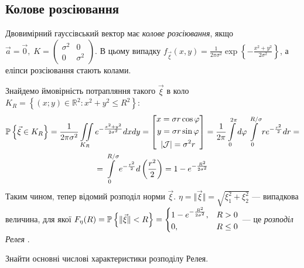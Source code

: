 \subsection{Колове розсіювання}
\begin{definition}
    Двовимірний гауссівський вектор має \emph{колове розсіювання}, якщо
    $\vec{a} = \vec{0}, \; K = \begin{pmatrix}
        \sigma^2 & 0 \\
        0 & \sigma^2
    \end{pmatrix}$. В цьому випадку $f_{\vec{\xi}}(x, y) = \frac{1}{2\pi\sigma^2} \exp\left\{-\frac{x^2+y^2}{2\sigma^2}\right\}$, 
    а еліпси розсіювання стають колами.
\end{definition}
Знайдемо ймовірність потрапляння такого $\vec{\xi}$ в коло $K_R = \left\{(x; y) \in \mathbb{R}^2 : x^2 + y^2 \leq R^2\right\}$:
\begin{gather*}
    \P\left\{\vec{\xi} \in K_R\right\} = \frac{1}{2\pi\sigma^2} \iint\limits_{K_R} e^{-\frac{x^2+y^2}{2\sigma^2}} dx dy = 
    \left[ \begin{gathered}
        x = \sigma r\cos\varphi \\
        y = \sigma r\sin\varphi \\
        |\mathcal{J}| = \sigma^2 r
    \end{gathered}\right] =
    \frac{1}{2\pi} \int\limits_0^{2\pi} d\varphi \int\limits_0^{R/\sigma} r e^{-\frac{r^2}{2}} dr = \\
    = \int\limits_0^{R/\sigma} e^{-\frac{r^2}{2}} d \left( \frac{r^2}{2}\right) = 
    1 - e^{-\frac{R^2}{2\sigma^2}}
\end{gather*}
Таким чином, тепер відомий розподіл норми $\vec{\xi}$. $\eta = \Vert \vec{\xi} \Vert = \sqrt{\xi_1^2 + \xi_2^2}$ --- випадкова величина,
для якої $F_{\eta}(R) = \P\left\{\Vert \vec{\xi} \Vert < R\right\} = \begin{cases}
    1 - e^{-\frac{R^2}{2\sigma^2}}, & R > 0 \\
    0, & R \leq 0
\end{cases}$ --- це \emph{розподіл Релея} .

\begin{exercise}
    Знайти основні числові характеристики розподілу Релея.
\end{exercise}

